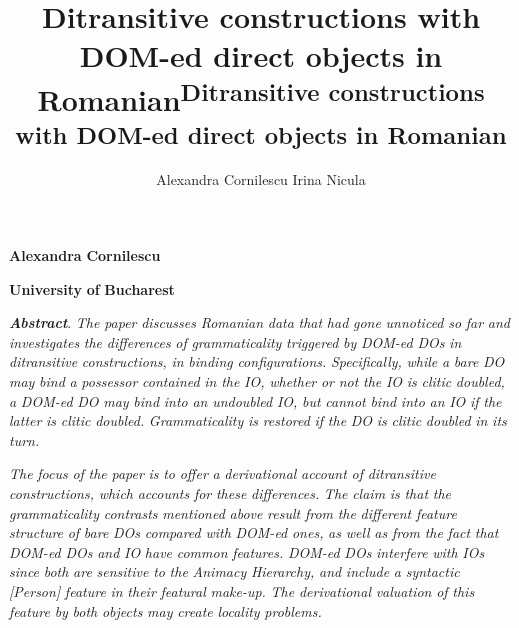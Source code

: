 \documentclass[output=paper,colorlinks,citecolor=brown]{./langscibook}
\author{Alexandra Cornilescu\affiliation{}\lastand 
Irina Nicula\affiliation{}}
\title{Ditransitive constructions with DOM-ed direct objects in Romanian}
\begin{document}
\maketitle 

\title{\textsuperscript{Ditransitive constructions with DOM-ed direct objects in Romanian}}

\textbf{Alexandra} \textbf{Cornilescu}

\textbf{University} \textbf{of} \textbf{Bucharest}

\textbf{\textit{Abstract}}. \textit{The} \textit{paper} \textit{discusses} \textit{Romanian} \textit{data} \textit{that} \textit{had} \textit{gone} \textit{unnoticed} \textit{so} \textit{far} \textit{and} \textit{investigates} \textit{the} \textit{differences} \textit{of} \textit{grammaticality} \textit{triggered} \textit{by} \textit{DOM-ed} \textit{DOs} \textit{in} \textit{ditransitive} \textit{constructions,} \textit{in} \textit{binding} \textit{configurations.} \textit{Specifically,} \textit{while} \textit{a} \textit{bare} \textit{DO} \textit{may} \textit{bind} \textit{a} \textit{possessor} \textit{contained} \textit{in} \textit{the} \textit{IO,} \textit{whether} \textit{or} \textit{not} \textit{the} \textit{IO} \textit{is} \textit{clitic} \textit{doubled,} \textit{a} \textit{DOM-ed} \textit{DO} \textit{may} \textit{bind} \textit{into} \textit{an} \textit{undoubled} \textit{IO,} \textit{but} \textit{cannot} \textit{bind} \textit{into} \textit{an} \textit{IO} \textit{if} \textit{the} \textit{latter} \textit{is} \textit{clitic} \textit{doubled.} \textit{Grammaticality} \textit{is} \textit{restored} \textit{if} \textit{the} \textit{DO} \textit{is} \textit{clitic} \textit{doubled} \textit{in} \textit{its} \textit{turn.}

\textit{The} \textit{focus} \textit{of} \textit{the} \textit{paper} \textit{is} \textit{to} \textit{offer} \textit{a} \textit{derivational} \textit{account} \textit{of} \textit{ditransitive} \textit{constructions,} \textit{which} \textit{accounts} \textit{for} \textit{these} \textit{differences.} \textit{The} \textit{claim} \textit{is} \textit{that} \textit{the} \textit{grammaticality} \textit{contrasts} \textit{mentioned} \textit{above} \textit{result} \textit{from} \textit{the} \textit{different} \textit{feature} \textit{structure} \textit{of} \textit{bare} \textit{DOs} \textit{compared} \textit{with} \textit{DOM-ed} \textit{ones,} \textit{as} \textit{well} \textit{as} \textit{from} \textit{the} \textit{fact} \textit{that} \textit{DOM-ed} \textit{DOs} \textit{and} \textit{IO} \textit{have} \textit{common} \textit{features.} \textit{DOM-ed} \textit{DOs} \textit{interfere} \textit{with} \textit{IOs} \textit{since} \textit{both} \textit{are} \textit{sensitive} \textit{to} \textit{the} \textit{Animacy} \textit{Hierarchy,} \textit{and} \textit{include} \textit{a} \textit{syntactic} \textit{[Person]} \textit{feature} \textit{in} \textit{their} \textit{featural} \textit{make-up.} \textit{The} \textit{derivational} \textit{valuation} \textit{of} \textit{this} \textit{feature} \textit{by} \textit{both} \textit{objects} \textit{may} \textit{create} \textit{locality} \textit{problems.}
\end{document}
